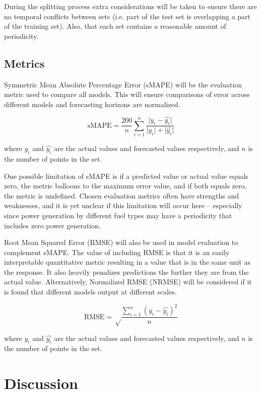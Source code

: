 \documentclass[sigconf]{acmart}
\begin{document}
During the splitting process extra considerations will be taken to ensure there are no temporal conflicts between sets (i.e. part of the test set is overlapping a part of the training set). Also, that each set contains a reasonable amount of periodicity. 

\subsection{Metrics}
Symmetric Mean Absolute Percentage Error (sMAPE) will be the evaluation metric used to compare all models. This will ensure comparisons of error across different models and forecasting horizons are normalized. 

\begin{equation}
\text{sMAPE} =\frac{200}{n}\sum_{i=1}^{n}\frac{\lvert y_i - \hat{y_i} \rvert}{\lvert y_i \rvert + \lvert \hat{y_i} \rvert}
\end{equation}

where $y_i$ and $\hat{y_i}$ are the actual values and forecasted values respectively, and $n$ is the number of points in the set.

One possible limitation of sMAPE is if a predicted value or actual value equals zero, the metric balloons to the maximum error value, and if both equals zero, the metric is undefined. Chosen evaluation metrics often have strengths and weaknesses, and it is yet unclear if this limitation will occur here -- especially since power generation by different fuel types may have a periodicity that includes zero power generation.

Root Mean Squared Error (RMSE) will also be used in model evaluation to complement sMAPE. The value of including RMSE is that it is an easily interpretable quantitative metric resulting in a value that is in the same unit as the response. It also heavily penalizes predictions the further they are from the actual value. Alternatively, Normalized RMSE (NRMSE) will be considered if it is found that different models output at different scales.

\begin{equation}
\text{RMSE} =\sqrt\frac{\sum_{i=1}^{n}(y_i - \hat{y_i})^2}{n}
\end{equation}

where $y_i$ and $\hat{y_i}$ are the actual values and forecasted values respectively, and $n$ is the number of points in the set.

\section{Discussion}
\end{document}
